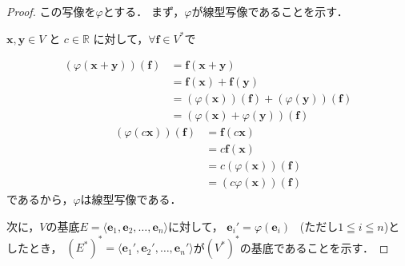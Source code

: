 \documentclass[a4paper,10pt,fleqn]{ltjsarticle}
\begin{document}
\begin{tleftbar}
    \begin{proof}
        この写像を$\varphi$とする．
        まず，$\varphi$が線型写像であることを示す．

        $\bm{x} , \bm{y} \in V$ と $c \in \mathbb{R}$ に対して，$ \forall \bm{f} \in V^\ast$で

        \begin{align*}
            ( \varphi(\bm{x}+\bm{y})) (\bm{f}) & = \bm{f} (\bm{x}+\bm{y})                                  \\
                                               & =\bm{f} (\bm{x}) + \bm{f} (\bm{y})                        \\
                                               & = (\varphi(\bm{x})) (\bm{f}) + (\varphi(\bm{y})) (\bm{f}) \\
                                               & = ( \varphi(\bm{x}) + \varphi(\bm{y})) (\bm{f})
        \end{align*}
        \begin{align*}
            ( \varphi(c \bm{x})) (\bm{f}) & = \bm{f} (c \bm{x})            \\
                                          & = c \bm{f} (\bm{x})            \\
                                          & = c (\varphi(\bm{x})) (\bm{f}) \\
                                          & = (c \varphi(\bm{x})) (\bm{f})
        \end{align*}
        であるから，$\varphi$は線型写像である．

        次に，$V$の基底$E= \langle \bm{e}_1 , \bm{e}_2, \dots , \bm{e}_n \rangle$に対して，
        $\bm{e}_i ' = \varphi ( \bm{e}_i)$ ~(ただし$1 \leqq i \leqq n$)としたとき，
        $(E^\ast )^\ast= \langle \bm{e}_1 ' , \bm{e}_2 ' , \dots , \bm{e}_n ' \rangle$が$(V^\ast)^\ast$の基底であることを示す．


\end{proof}
\end{tleftbar}
\end{document}
